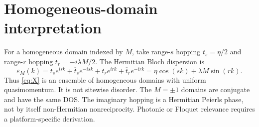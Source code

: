 \documentclass[11pt]{amsart}
\numberwithin{equation}{section}\setcounter{tocdepth}{3}\setcounter{secnumdepth}{3}
\begin{document}
\section{Homogeneous-domain interpretation}\label{sec:physics}
For a homogeneous domain indexed by $M$, take range-$s$ hopping $t_s=\eta/2$ and
range-$r$ hopping $t_r=-i\lambda M/2$.  The Hermitian Bloch dispersion is
\begin{equation}\varepsilon_M(k)=t_se^{isk}+\overline t_se^{-isk}+t_re^{irk}+\overline t_re^{-irk}
=\eta\cos(sk)+\lambda M\sin(rk).\label{eq:dispersion}\end{equation}
Thus \eqref{eq:X} is an ensemble of homogeneous domains with uniform quasimomentum.
It is not sitewise disorder.  The $M=\pm1$ domains are conjugate and have the same DOS.
The imaginary hopping is a Hermitian Peierls phase, not by itself non-Hermitian
nonreciprocity.  Photonic or Floquet relevance requires a platform-specific derivation.
\end{document}
